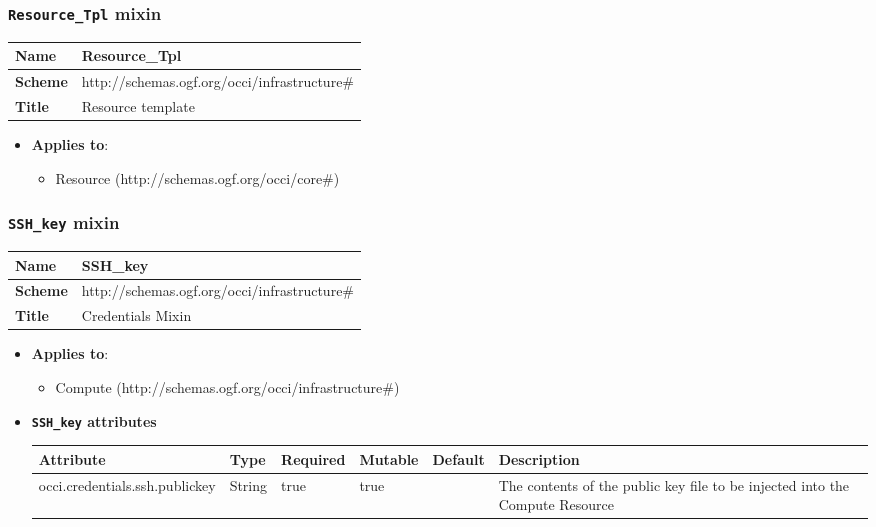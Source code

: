 \subsubsection{\texttt{Resource\_Tpl} mixin}
\begin{center}
\begin{tabular}{|l|l|}
  \hline
  \textbf{Name} & Resource\_Tpl \\
  \hline  
  \textbf{Scheme} & http://schemas.ogf.org/occi/infrastructure\# \\
  \hline
  \textbf{Title} & Resource template \\
  \hline
\end{tabular}
\end{center}
\begin{itemize}
\item \textbf{Applies to}:
\begin{itemize}
	\item Resource (http://schemas.ogf.org/occi/core\#)
\end{itemize}
\end{itemize} 



 
\subsubsection{\texttt{SSH\_key} mixin}
\begin{center}
\begin{tabular}{|l|l|}
  \hline
  \textbf{Name} & SSH\_key \\
  \hline  
  \textbf{Scheme} & http://schemas.ogf.org/occi/infrastructure\# \\
  \hline
  \textbf{Title} & Credentials Mixin \\
  \hline
\end{tabular}
\end{center}
\begin{itemize}
\item \textbf{Applies to}:
\begin{itemize}
	\item Compute (http://schemas.ogf.org/occi/infrastructure\#)
\end{itemize}
\end{itemize} 

\begin{itemize}
\item \textbf{\texttt{SSH\_key} attributes}

\begin{tabularx}{\textwidth}{|l|l|p{1.4cm}|p{1.3cm}|l|X|}
  \hline
  \textbf{Attribute} & \textbf{Type} & \textbf{Required} & \textbf{Mutable} & \textbf{Default} & \textbf{Description} \\
  \hline  
  occi.credentials.ssh.publickey & String & true & true &  & The contents of the public key file to be injected into the Compute Resource \\
  \hline
\end{tabularx}
\end{itemize}


